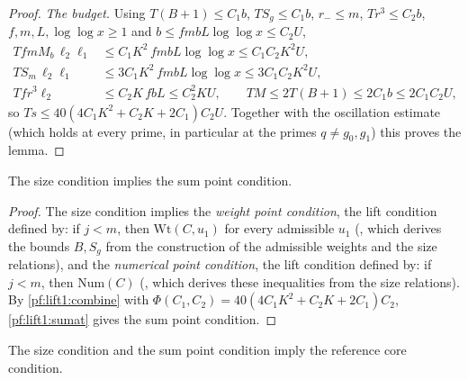 \begin{proof}
\emph{The budget.} Using $T(B+1)\le C_1b$, $TS_g\le C_1b$, $r_-\le m$, $Tr^3\le C_2b$, $f,m,L,\log\log x\ge1$
and $b\le fmbL\log\log x\le C_2U$,
\begin{align*}
TfmM_b\,\ell_2\ell_1&\le C_1K^2\,fmbL\log\log x\le C_1C_2K^2U,\\
TS_m\,\ell_2\ell_1&\le3C_1K^2\,fmbL\log\log x\le3C_1C_2K^2U,\\
Tfr^3\ell_2&\le C_2K\,fbL\le C_2^2KU,\qquad TM\le2T(B+1)\le2C_1b\le2C_1C_2U,
\end{align*}
so $Ts\le40(4C_1K^2+C_2K+2C_1)C_2U$. Together with the oscillation estimate (which holds at every prime,
in particular at the primes $q\ne g_0,g_1$) this proves the lemma.
\end{proof}

\begin{theorem}\label{pf:lift1:sumpt}
The size condition implies the sum point condition.
\end{theorem}

\begin{proof}
The size condition implies the \emph{weight point condition}, the lift condition defined by: if $j<m$,
then $\mathrm{Wt}(C,u_1)$ for every admissible $u_1$
(, which derives the bounds $B,S_g$ from the construction of
the admissible weights and the size relations), and the \emph{numerical point condition}, the lift
condition defined by: if $j<m$, then $\mathrm{Num}(C)$
(, which derives these inequalities from
the size relations). By \cref{pf:lift1:combine} with
$\Phi(C_1,C_2)=40(4C_1K^2+C_2K+2C_1)C_2$, \cref{pf:lift1:sumat} gives the sum point condition.
\end{proof}

\begin{theorem}\label{pf:lift1:refcore}
The size condition and the sum point condition imply the reference core condition.
\end{theorem}

